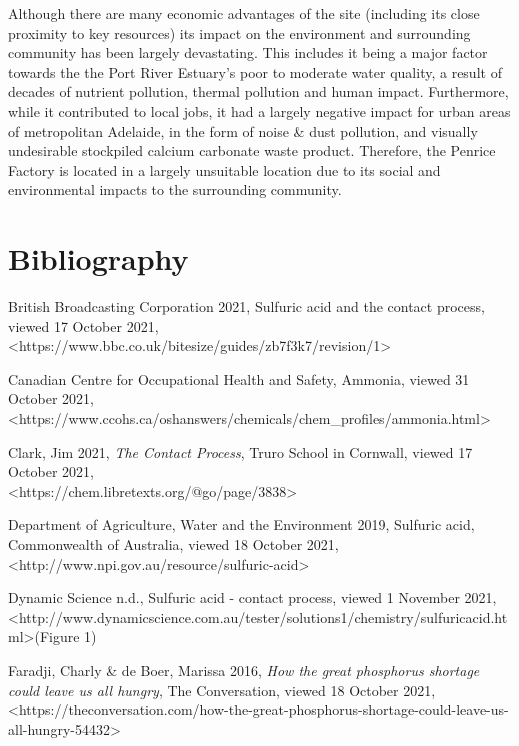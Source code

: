 \documentclass[12pt, a4paper]{article}
\begin{document}
Although there are many economic advantages of the site (including its close proximity to key resources) its impact on the environment and surrounding community has been largely devastating. This includes it being a major factor towards the the Port River Estuary's poor to moderate water quality, a result of decades of nutrient pollution, thermal pollution and human impact. Furthermore, while it contributed to local jobs, it had a largely negative impact for urban areas of metropolitan Adelaide, in the form of noise \& dust pollution, and visually undesirable stockpiled calcium carbonate waste product. Therefore, the Penrice Factory is located in a largely unsuitable location due to its social and environmental impacts to the surrounding community. 
\pagebreak

\section{Bibliography}

British Broadcasting Corporation 2021, Sulfuric acid and the contact process, viewed 17 October 2021, \\ \textless{https://www.bbc.co.uk/bitesize/guides/zb7f3k7/revision/1}\textgreater

Canadian Centre for Occupational Health and Safety, Ammonia, viewed 31 October 2021, \\ \textless{https://www.ccohs.ca/oshanswers/chemicals/chem\_profiles/ammonia.html}\textgreater

Clark, Jim 2021, \emph{The Contact Process}, Truro School in Cornwall, viewed 17 October 2021, \\ \textless{https://chem.libretexts.org/@go/page/3838}\textgreater

Department of Agriculture, Water and the Environment 2019, Sulfuric acid, Commonwealth of Australia, viewed 18 October 2021, \textless{http://www.npi.gov.au/resource/sulfuric-acid}\textgreater

Dynamic Science n.d., Sulfuric acid - contact process, viewed 1 November 2021, \textless{http://www.dynamicscience.com.au/tester/solutions1/chemistry/sulfuricacid.html}\textgreater (Figure 1)

Faradji, Charly \& de Boer, Marissa 2016, \emph{How the great phosphorus shortage could leave us all hungry}, The Conversation, viewed 18 October 2021, \\ \textless{https://theconversation.com/how-the-great-phosphorus-shortage-could-leave-us-all-hungry-54432}\textgreater
\end{document}

